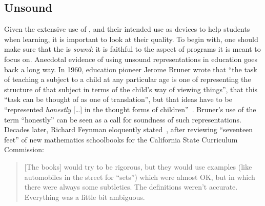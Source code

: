 \subsection{Unsound \NMs{}}
\label{sec:UnsoundNotionalMachines}

Given the extensive use of \nms{},
and
their intended use as devices to help students when learning,
it is important to look at their quality.
To begin with,
one should
make sure that the \nm{} is \emph{sound}:
it is
faithful to the aspect of programs it is meant to focus on.
%
Anecdotal evidence of using unsound representations in education goes back a long way.
%
In 1960, education pioneer Jerome Bruner wrote that
``the task of teaching a subject to a child at any particular age is one of representing the structure of that subject in terms of the child’s way of viewing things'', that this
``task can be thought of as one of translation'', but that ideas have to be
``represented \emph{honestly} […] in the thought forms of children''~\cite{ brunerProcessEducation1960}.
Bruner’s use of the term ``honestly'' can be seen as a call for soundness of such representations.
%
Decades later,
Richard Feynman eloquently stated~\citep{feynmanSurelyYouRe1985},
after reviewing ``seventeen feet'' of new mathematics schoolbooks for the California State Curriculum Commission:

\begin{quote}
    [The books] would try to be rigorous, but they would use examples
    (like automobiles in the street for ``sets'')
    which were almost OK, but in which there were always some subtleties.
    The definitions weren't accurate.
    Everything was a little bit ambiguous.
\end{quote}

